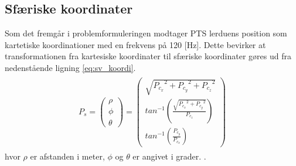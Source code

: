 \subsection{Sfæriske koordinater}
Som det fremgår i problemformuleringen modtager PTS lerduens position som kartetiske koordinationer med en frekvens på 120 [Hz]. Dette bevirker at transformationen fra kartesiske koordinater til sfæriske koordinater gøres ud fra nedenstående ligning \ref{eq:sv_koordi}.
\begin{align}
\begin{split}
{ P }_{ s } =\left( \begin{matrix} \rho  \\ \phi  \\ \theta  \end{matrix} \right) =\left( \begin{matrix} \sqrt { { { P }_{ c_{ x } } }^{ 2 }+{ { P }_{ c_{ y } } }^{ 2 }+{ { P }_{ c_{ z } } }^{ 2 } }  \\ { tan }^{ -1 }\left( \frac { \sqrt { { { P }_{ c_{ x } } }^{ 2 }+{ { P }_{ c_{ y } } }^{ 2 } }  }{ { P }_{ c_{ z } } }  \right)  \\ { tan }^{ -1 }\left( \frac { { P }_{ c_{ y } } }{ { P }_{ c_{ x } } }  \right)  \end{matrix} \right) %
\label{eq:sv_koordi}
\end{split}
\end{align}
hvor \(\rho\) er afstanden i meter, \(\phi\) og \(\theta\) er angivet i grader. \citep[Kap. 10.6]{adam}.
